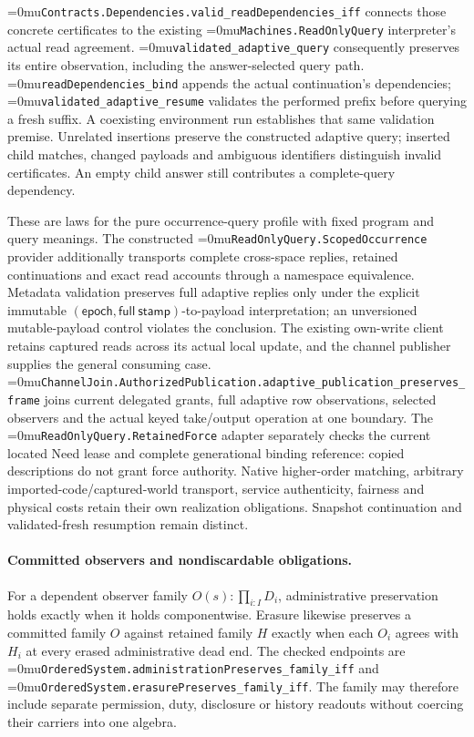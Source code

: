 \documentclass[11pt]{article}
\newcommand{\leanname}[1]{\textup{\Urlmuskip=0mu\relax\nolinkurl{#1}}}
\theoremstyle{definition}
\theoremstyle{remark}
\begin{document}
\leanname{Contracts.Dependencies.valid_readDependencies_iff} connects those
concrete certificates to the existing \leanname{Machines.ReadOnlyQuery}
interpreter's actual read agreement.
\leanname{validated_adaptive_query} consequently preserves its entire
observation, including the answer-selected query path.
\leanname{readDependencies_bind} appends the actual continuation's
dependencies; \leanname{validated_adaptive_resume} validates the performed
prefix before querying a fresh suffix. A coexisting environment run
establishes that same validation premise. Unrelated insertions preserve the
constructed adaptive query; inserted child matches, changed payloads and
ambiguous identifiers distinguish invalid certificates. An empty child
answer still contributes a complete-query dependency.

These are laws for the pure occurrence-query profile with fixed program and
query meanings. The constructed \leanname{ReadOnlyQuery.ScopedOccurrence}
provider additionally transports complete cross-space replies, retained
continuations and exact read accounts through a namespace equivalence.
Metadata validation preserves full adaptive replies only under the explicit
immutable $(\mathsf{epoch},\mathsf{full\ stamp})$-to-payload interpretation;
an unversioned mutable-payload control violates the conclusion. The existing
own-write client retains captured reads across its actual local update, and
the channel publisher supplies the general consuming case.
\leanname{ChannelJoin.AuthorizedPublication.adaptive_publication_preserves_frame}
joins current delegated grants, full adaptive row observations, selected
observers and the actual keyed take/output operation at one boundary.
The \leanname{ReadOnlyQuery.RetainedForce} adapter separately checks the
current located Need lease and complete generational binding reference:
copied descriptions do not grant force authority. Native higher-order
matching, arbitrary imported-code/captured-world transport, service authenticity,
fairness and physical costs retain their own realization obligations.
Snapshot continuation and validated-fresh resumption remain distinct.

\paragraph{Committed observers and nondiscardable obligations.}
For a dependent observer family $O(s):\prod_{i:I}D_i$, administrative
preservation holds exactly when it holds componentwise. Erasure likewise
preserves a committed family $O$ against retained family $H$ exactly when
each $O_i$ agrees with $H_i$ at every erased administrative dead end.
The checked endpoints are
\leanname{OrderedSystem.administrationPreserves_family_iff} and
\leanname{OrderedSystem.erasurePreserves_family_iff}. The family may therefore
include separate permission, duty, disclosure or history readouts without
coercing their carriers into one algebra.
\end{document}
